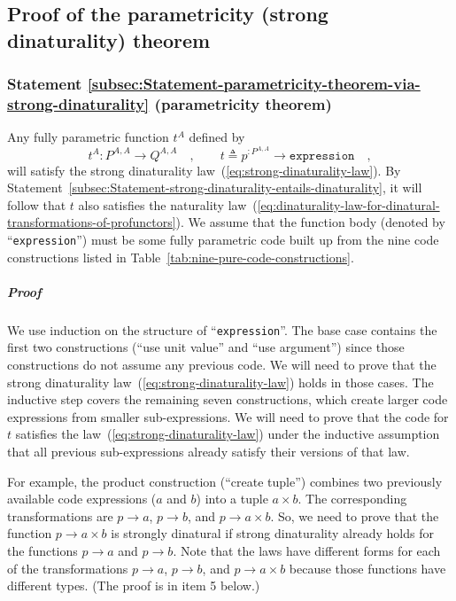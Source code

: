 \subsection{Proof of the parametricity (strong dinaturality) theorem}

\subsubsection{Statement \ref{subsec:Statement-parametricity-theorem-via-strong-dinaturality}\label{subsec:Statement-parametricity-theorem-via-strong-dinaturality}
(parametricity theorem)}

Any fully parametric function $t^{A}$ defined by 
\[
t^{A}:P^{A,A}\rightarrow Q^{A,A}\quad,\quad\quad t\triangleq p^{:P^{A,A}}\rightarrow{\scriptstyle \mathtt{expression}}\quad,
\]
will satisfy the strong dinaturality law~(\ref{eq:strong-dinaturality-law}).
By Statement~\ref{subsec:Statement-strong-dinaturality-entails-dinaturality},
it will follow that $t$ also satisfies the naturality law~(\ref{eq:dinaturality-law-for-dinatural-transformations-of-profunctors}).
We assume that the function body (denoted by \textsf{``}\lstinline!expression!\textsf{''})
must be some fully parametric code built up from the nine code constructions
listed in Table~\ref{tab:nine-pure-code-constructions}.

\subparagraph{Proof }

We use induction on the structure of \textsf{``}\lstinline!expression!\textsf{''}.
The base case contains the first two constructions (\textsf{``}use unit value\textsf{''}
and \textsf{``}use argument\textsf{''}) since those constructions do not assume any
previous code. We will need to prove that the strong dinaturality
law~(\ref{eq:strong-dinaturality-law}) holds in those cases. The
inductive step covers the remaining seven constructions, which create
larger code expressions from smaller sub-expressions. We will need
to prove that the code for $t$ satisfies the law~(\ref{eq:strong-dinaturality-law})
under the inductive assumption that all previous sub-expressions already
satisfy their versions of that law.

For example, the product construction (\textsf{``}create tuple\textsf{''}) combines
two previously available code expressions ($a$ and $b$) into a tuple
$a\times b$. The corresponding transformations are $p\rightarrow a$,
$p\rightarrow b$, and $p\rightarrow a\times b$. So, we need to prove
that the function $p\rightarrow a\times b$ is strongly dinatural
if strong dinaturality already holds for the functions $p\rightarrow a$
and $p\rightarrow b$. Note that the laws have different forms for
each of the transformations $p\rightarrow a$, $p\rightarrow b$,
and $p\rightarrow a\times b$ because those functions have different
types. (The proof is in item 5 below.)


